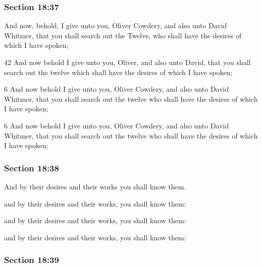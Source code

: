 	\subsubsection{Section 18:37} %
		\label{DC18-37}

		And now, behold, I give unto you, Oliver Cowdery, and also unto David Whitmer, that you shall search out the Twelve, who shall have the desires of which I have spoken;

		\begin{framed}
		\scriptsize
			\begin{compactdesc}
				\item[JSP] 42 And now behold I give unto you, Oliver, and also unto David, that you shall search out the twelve which shall have the desires of which I have spoken; 
				\item[DC 1835] 6 And now behold I give unto you, Oliver Cowdery, and also unto David Whitmer, that you shall search out the twelve who shall have the desires of which I have spoken; 
				\item[DC 1844] 6 And now behold I give unto you, Oliver Cowdery, and also unto David Whitmer, that you shall search out the twelve who shall have the desires of which I have spoken; 
			\end{compactdesc}
		\end{framed}

	\subsubsection{Section 18:38} %
		\label{DC18-38}

		And by their desires and their works you shall know them.

		\begin{framed}
		\scriptsize
			\begin{compactdesc}
				\item[JSP] and by their desires and their works, you shall know them:
				\item[DC 1835] and by their desires and their works, you shall know them: 
				\item[DC 1844] and by their desires and their works, you shall know them: 
			\end{compactdesc}
		\end{framed}

	\subsubsection{Section 18:39} %
		\label{DC18-39}

